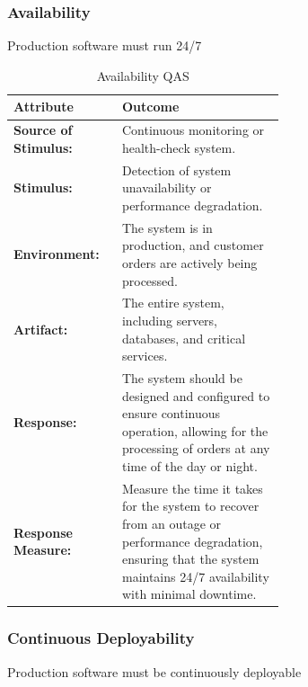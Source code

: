 \documentclass[conference]{IEEEtran}
\begin{document}
\subsubsection{\textbf{Availability}}Production software must run 24/7

\begin{table}[H]
    \centering
    \begin{tabular}{|l|p{0.6\linewidth}|}
        \hline
        \textbf{Attribute} & \textbf{Outcome} \\
        \hline
        \textbf{Source of Stimulus:} & Continuous monitoring or health-check system. \\
        \hline
        \textbf{Stimulus:} & Detection of system unavailability or performance degradation. \\
        \hline
        \textbf{Environment:} & The system is in production, and customer orders are actively being processed. \\
        \hline
        \textbf{Artifact:} & The entire system, including servers, databases, and critical services. \\
        \hline
        \textbf{Response:} & The system should be designed and configured to ensure continuous operation, allowing for the processing of orders at any time of the day or night. \\
        \hline
        \textbf{Response Measure:} & Measure the time it takes for the system to recover from an outage or performance degradation, ensuring that the system maintains 24/7 availability with minimal downtime. \\
        \hline
    \end{tabular}
    \caption{Availability QAS}
\end{table}

\subsubsection{\textbf{Continuous Deployability}}Production software must be continuously deployable
\end{document}
